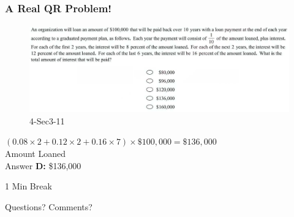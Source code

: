 \documentclass[
	11pt, %
]{beamer}
\begin{document}

\begin{frame}
	\frametitle{A Real QR Problem!}
	\framesubtitle{}
	\begin{figure}
		\includegraphics[width=\linewidth]{Interest_Example_Question2.png}
		\caption{4-Sec3-11}
	\end{figure}
	\pause
	$(0.08 \times 2 + 0.12 \times 2 + 0.16 \times 7) \times \$100,000= \$136,000$\\
\alert{Amount Loaned}\\
	\bigskip
	Answer \textbf{D: } \$136,000
\end{frame}



\begin{frame}[plain] %
	\begin{center}
		{\Huge 1 Min Break}
		\bigskip\bigskip %
		
		{\LARGE Questions? Comments?}
	\end{center}
\end{frame}

\end{document}
